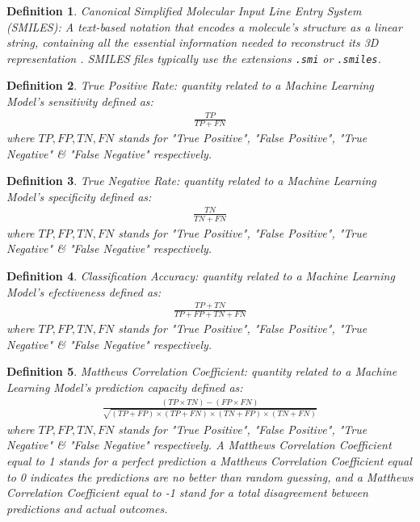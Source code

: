 \documentclass[11pt]{article}
\newtheorem{definition}{Definition}
\begin{document}
\begin{definition}\label{definitionSMILES}
Canonical Simplified Molecular Input Line Entry System (SMILES): A text-based notation that encodes a molecule’s structure as a linear string, containing all the essential information needed to reconstruct its 3D representation \cite{smiles}. SMILES files typically use the extensions \texttt{.smi} or \texttt{.smiles}.
\end{definition}

\begin{definition}\label{definitionTruePositiveRate}
True Positive Rate: quantity related to a Machine Learning Model's sensitivity defined as:
\begin{align}
\frac{TP}{TP+FN}
\end{align}
where $TP,FP,TN,FN$ stands for "True Positive", "False Positive", "True Negative" \& "False Negative" respectively.
\end{definition}

\begin{definition}\label{definitionTrueNegativeRate}
True Negative Rate: quantity related to a Machine Learning Model's specificity defined as:
\begin{align}
\frac{TN}{TN+FN}
\end{align}
where $TP,FP,TN,FN$ stands for "True Positive", "False Positive", "True Negative" \& "False Negative" respectively.
\end{definition}

\begin{definition}\label{definitionClassificationAccuracy}
Classification Accuracy: quantity related to a Machine Learning Model's efectiveness defined as:
\begin{align}
\frac{TP+TN}{TP+FP+TN+FN}
\end{align}
where $TP,FP,TN,FN$ stands for "True Positive", "False Positive", "True Negative" \& "False Negative" respectively.
\end{definition}

\begin{definition}\label{definitionMatthewsCorrelationCoeficient}
Matthews Correlation Coefficient: quantity related to a Machine Learning Model's prediction capacity defined as:
{\scriptsize
\begin{align}
\frac{(TP\times TN)-(FP\times FN)}{\sqrt{(TP+FP)\times(TP+FN)\times(TN+FP)\times(TN+FN)}}
\end{align}
}where $TP,FP,TN,FN$ stands for "True Positive", "False Positive", "True Negative" \& "False Negative" respectively.
A Matthews Correlation Coefficient equal to 1 stands for a perfect prediction a Matthews Correlation Coefficient equal to 0 indicates the predictions are no better than random guessing, and a Matthews Correlation Coefficient equal to -1 stand for a total disagreement between predictions and actual outcomes.
\end{definition}
\end{document}
